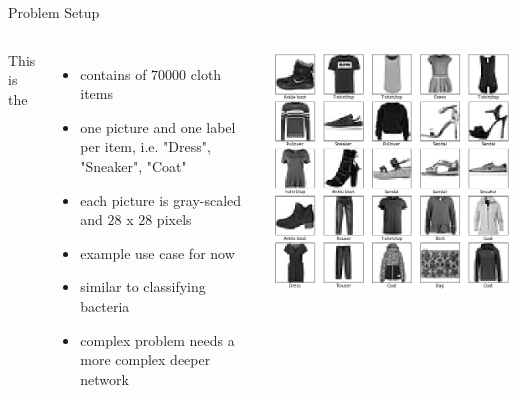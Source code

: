 \documentclass[aspectratio=169]{beamer}
\begin{document}
\begin{frame}{Problem Setup}
	\begin{columns}
		This is the \href{https://github.com/zalandoresearch/fashion-mnist}{\color{blue}{Fashion MNIST dataset}}
			 \begin{itemize}
				\item  contains of $70000$ cloth items
				\item one picture and one label per item, i.e. "Dress", "Sneaker", "Coat"
				\item each picture is gray-scaled and $28$ x $28$ pixels
				\item example use case for now
				\item similar to classifying bacteria
				\item complex problem needs a more complex deeper network
			\end{itemize}
			\includegraphics[width=\linewidth]{images/fashion_mnist.png}
	\end{columns}

\end{frame}

\end{document}
